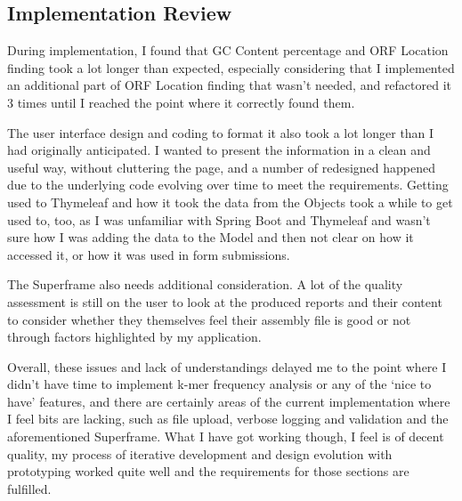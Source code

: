 \subsection{Implementation Review}
During implementation, I found that GC Content percentage and ORF Location finding took a lot longer than expected, especially considering that I implemented an additional part of ORF Location finding that wasn't needed, and refactored it 3 times until I reached the point where it correctly found them.

The user interface design and coding to format it also took a lot longer than I had originally anticipated. I wanted to present the information in a clean and useful way, without cluttering the page, and a number of redesigned happened due to the underlying code evolving over time to meet the requirements. Getting used to Thymeleaf and how it took the data from the Objects took a while to get used to, too, as I was unfamiliar with Spring Boot and Thymeleaf and wasn't sure how I was adding the data to the Model and then not clear on how it accessed it, or how it was used in form submissions.

The Superframe also needs additional consideration. A lot of the quality assessment is still on the user to look at the produced reports and their content to consider whether they themselves feel their assembly file is good or not through factors highlighted by my application. 

Overall, these issues and lack of understandings delayed me to the point where I didn't have time to implement k-mer frequency analysis or any of the `nice to have' features, and there are certainly areas of the current implementation where I feel bits are lacking, such as file upload, verbose logging and validation and the aforementioned Superframe. What I have got working though, I feel is of decent quality, my process of iterative development and design evolution with prototyping worked quite well and the requirements for those sections are fulfilled.




